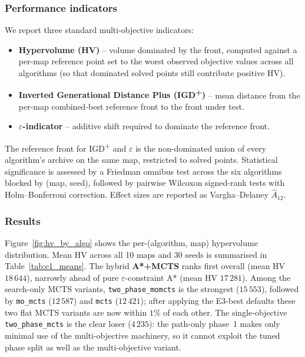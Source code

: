 \subsubsection{Performance indicators}
We report three standard multi-objective indicators:
\begin{itemize}
  \item \textbf{Hypervolume (HV)} -- volume dominated by the front, computed against a per-map reference point set to the worst observed objective values across all algorithms (so that dominated solved points still contribute positive HV).
  \item \textbf{Inverted Generational Distance Plus (IGD\textsuperscript{+})} -- mean distance from the per-map combined-best reference front to the front under test.
  \item \textbf{$\varepsilon$-indicator} -- additive shift required to dominate the reference front.
\end{itemize}
The reference front for IGD\textsuperscript{+} and $\varepsilon$ is the non-dominated union of every algorithm's archive on the same map, restricted to solved points. Statistical significance is assessed by a Friedman omnibus test across the six algorithms blocked by (map, seed), followed by pairwise Wilcoxon signed-rank tests with Holm--Bonferroni correction. Effect sizes are reported as Vargha--Delaney $\hat A_{12}$.

\subsubsection{Results}
Figure~\ref{fig:hv_by_algo} shows the per-(algorithm, map) hypervolume distribution. Mean HV across all 10 maps and 30 seeds is summarised in Table~\ref{tab:e1_means}. The hybrid \textbf{A*+MCTS} ranks first overall (mean HV $18\,644$), narrowly ahead of pure $\varepsilon$-constraint A* (mean HV $17\,281$). Among the search-only MCTS variants, \texttt{two\_phase\_momcts} is the strongest ($15\,553$), followed by \texttt{mo\_mcts} ($12\,587$) and \texttt{mcts} ($12\,421$); after applying the E3-best defaults these two flat MCTS variants are now within $1\%$ of each other. The single-objective \texttt{two\_phase\_mcts} is the clear loser ($4\,235$): the path-only phase~1 makes only minimal use of the multi-objective machinery, so it cannot exploit the tuned phase split as well as the multi-objective variant.

